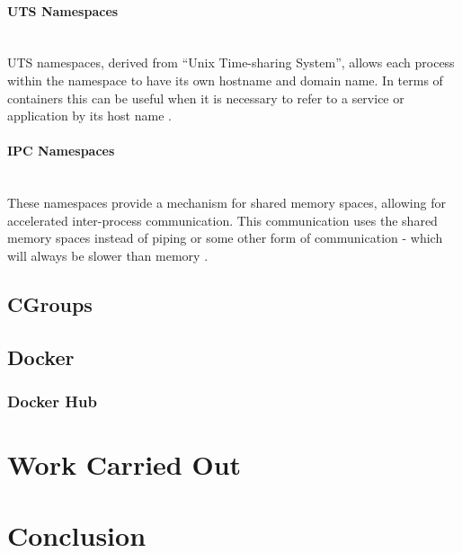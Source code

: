 \documentclass{article}
\begin{document}
\paragraph{UTS Namespaces}\mbox{}\\
UTS namespaces, derived from ``Unix Time-sharing System'', allows each process within the namespace to have its own hostname and domain name. In terms of containers this can be useful when it is necessary to refer to a service or application by its host name \citep{Kerrisk2013}.

\paragraph{IPC Namespaces}\mbox{}\\
These namespaces provide a mechanism for shared memory spaces, allowing for accelerated inter-process communication. This communication uses the shared memory spaces instead of piping or some other form of communication - which will always be slower than memory \citep{Docker2016}.

\subsection{CGroups}
\label{subs:CGroups}



\subsection{Docker}
\label{subs:Docker}

\subsubsection{Docker Hub}






\newpage
\section{Work Carried Out}
\label{sec:Work}

\newpage
\section{Conclusion}
\label{sec:Conclusion}

\newpage

\end{document}
